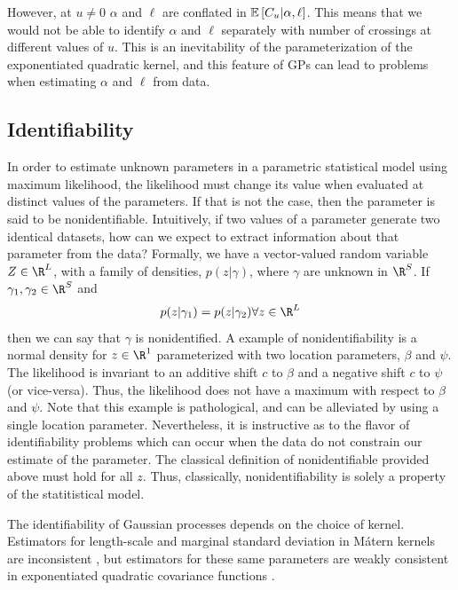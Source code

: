 \documentclass{article}
\newcommand{\Exp}[1]{\ensuremath{\mathbb{E} \lb #1 \rb}}
\newcommand{\lb}{\ensuremath{\left[}}
\newcommand{\rb}{\ensuremath{\right]}}
\begin{document}
However, at $u \neq 0$ $\alpha$ and $\ell$ are conflated in $\Exp{C_u | \alpha,
\ell}$.  This means that we would not be able to identify $\alpha$ and $\ell$
separately with number of crossings at different values of $u$.  This is an
inevitability of the parameterization of the exponentiated quadratic kernel,
and this feature of GPs can lead to problems when estimating $\alpha$ and
$\ell$ from data.

\subsection{Identifiability}

In order to estimate unknown parameters in a parametric statistical model using
maximum likelihood, the likelihood must change its value when evaluated at
distinct values of the parameters. If that is not the case, then the parameter
is said to be nonidentifiable. Intuitively, if two values of a parameter
generate two identical datasets, how can we expect to extract information about
that parameter from the data? Formally, we have a vector-valued random variable
$Z \in \R^L$, with a family of densities, $p(z | \gamma)$, where $\gamma$ are
unknown in $\R^S$. If $\gamma_1, \gamma_2 \in \R^S$ and 
\begin{align*}
  p(z | \gamma_1) = p(z | \gamma_2) \forall z \in \R^L
\end{align*}
then we can say that $\gamma$ is nonidentified. A example of nonidentifiability
is a normal density for $z \in \R^1$ parameterized with two location
parameters, $\beta$ and $\psi$. The likelihood is invariant to an additive
shift $c$ to $\beta$ and a negative shift $c$ to $\psi$ (or vice-versa). Thus,
the likelihood does not have a maximum with respect to $\beta$ and $\psi$. Note
that this example is pathological, and can be alleviated by using a single
location parameter. Nevertheless, it is instructive as to the flavor of
identifiability problems which can occur when the data do not constrain our
estimate of the parameter. The classical definition of nonidentifiable provided
above must hold for all $z$. Thus, classically, nonidentifiability is solely a
property of the statitistical model.

The identifiability of Gaussian processes depends on the choice of kernel.
Estimators for length-scale and marginal standard deviation in M\'{a}tern
kernels are inconsistent \cite{zhang2004inconsistent}, but estimators for these
same parameters are weakly consistent in exponentiated quadratic covariance
functions \cite{abt1998fisher}. 
\end{document}
